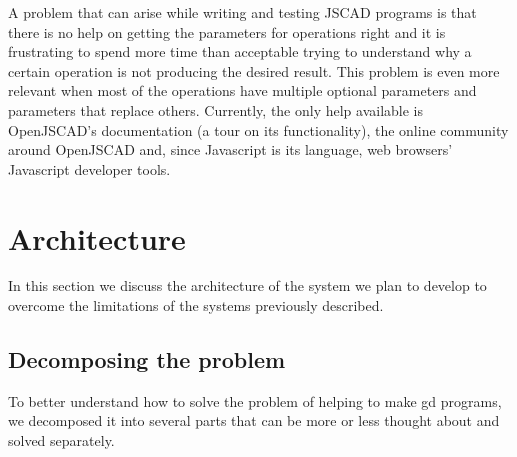 \documentclass{./llncs2e/llncs}
\begin{document}
	A problem that can arise while writing and testing JSCAD programs is that there is no help on getting the parameters for operations right and it is frustrating to spend more time than acceptable trying to understand why a certain operation is not producing the desired result. 
	This problem is even more relevant when most of the operations have multiple optional parameters and parameters that replace others. 
	Currently, the only help available is OpenJSCAD's documentation (a tour on its functionality), the online community around OpenJSCAD and, since Javascript is its language, web browsers' Javascript developer tools.



\section{Architecture}
	In this section we discuss the architecture of the system we plan to develop to overcome the limitations of the systems previously described.

\subsection{Decomposing the problem}
	To better understand how to solve the problem of helping to make \ac{gd} programs, we decomposed it into several parts that can be more or less thought about and solved separately.
	
	
	
\end{document}
